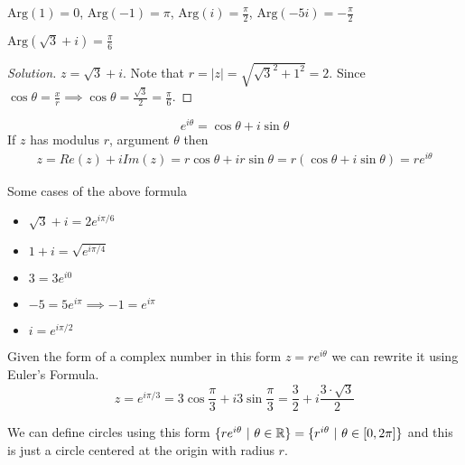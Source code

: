\documentclass[12pt]{scrartcl}
\begin{document}
\begin{example}
  $\text{Arg}(1) = 0$, $\text{Arg}(-1) = \pi$, $\text{Arg}(i) = \frac{\pi}{2}$, $\text{Arg}(-5i) = -\frac{\pi}{2}$
\end{example}

\begin{example}
  $\text{Arg}(\sqrt{3} + i) = \frac{\pi}{6}$
  \begin{proof}[Solution]
    $z = \sqrt{3} + i$. Note that $r = |z| = \sqrt{\sqrt{3}^2 + 1^2} = 2$. Since $\cos\theta = \frac{x}{r} \implies \cos\theta = \frac{\sqrt{3}}{2} = \frac{\pi}{6}$.
  \end{proof}
\end{example}

\begin{definition}
  \[e^{i\theta} = \cos\theta + i\sin\theta\]
  If $z$ has modulus $r$, argument $\theta$ then 
  \begin{align*}
    z = Re(z) + iIm(z) = r\cos\theta + ir\sin\theta = r(\cos\theta + i\sin\theta) = re^{i\theta}
  \end{align*}
\end{definition}

\begin{example} Some cases of the above formula

  \begin{itemize}
    \item $\sqrt{3} + i = 2e^{i\pi / 6}$
    \item $1 + i = \sqrt{e^{i\pi / 4}}$
    \item $3 = 3e^{i0}$
    \item $-5 = 5e^{i\pi} \implies -1 = e^{i\pi}$
    \item $i = e^{i \pi / 2}$
  \end{itemize}
\end{example}

\begin{example}
  Given the form of a complex number in this form $z = re^{i\theta}$ we can rewrite it using Euler's Formula.
  \[z = e^{i\pi / 3} = 3\cos\frac{\pi}{3} + i3\sin\frac{\pi}{3} = \frac{3}{2} + i\frac{3 \cdot \sqrt{3}}{2}\]
\end{example}

\begin{note}
  We can define circles using this form $\{re^{i\theta} \ | \ \theta \in \mathbb R\} = \{r^{i\theta} \ | \ \theta \in [0, 2\pi]\}$ and this is just a circle centered at the 
  origin with radius $r$. 
\end{note}
\end{document}
